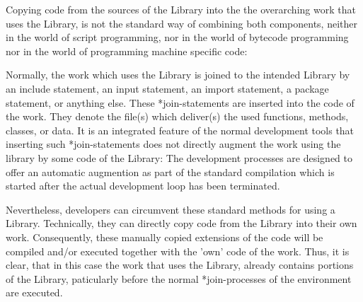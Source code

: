 Copying code from the sources of the Library into the the overarching work that
uses the Library, is not the standard way of combining both components, neither
in the world of script programming, nor in the world of bytecode programming
nor in the world of programming machine specific code:

Normally, the work which uses the Library is joined to the intended Library by
an include statement, an input statement, an import statement, a package
statement, or anything else. These *join-statements are inserted into the code
of the work. They denote the file(s) which deliver(s) the used functions,
methods, classes, or data. It is an integrated feature of the normal development
tools that inserting such *join-statements does not directly augment the work
using the library by some code of the Library: The development processes are
designed to offer an automatic augmention as part of the standard compilation
which is started after the actual development loop has been terminated.

Nevertheless, developers can circumvent these standard methods for using a
Library. Technically, they can directly copy code from the Library into their
own work. Consequently, these manually copied extensions of the code will be
compiled and/or executed together with the 'own' code of the work. Thus, it is
clear, that in this case the work that uses the Library, already contains
portions of the Library, paticularly before the normal *join-processes of the
environment are executed.

